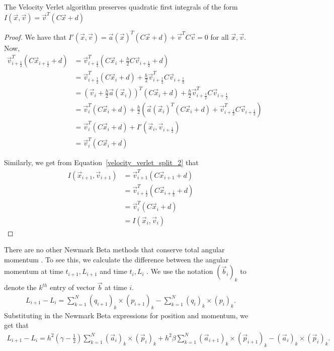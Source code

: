 \documentclass[../Main.tex]{subfiles}
\begin{document}
\begin{theorem} The Velocity Verlet algorithm preserves quadratic first integrals of the form $I(\vec{x}, \vec{v}) = \vec{v}^{T}\left(C\vec{x} + d\right)$ \end{theorem}
\begin{proof}
We have that $I'(\vec{x}, \vec{v}) = \vec{a}(\vec{x})^{T}\left(C\vec{x} + d\right) + \vec{v}^{T}C\vec{v} = 0$ for all $\vec{x}, \vec{v}$.
Now,
\begin{align*}
\vec{v}_{i+\frac{1}{2}}^{T}\left(C\vec{x}_{i+\frac{1}{2}} + d\right) &= \vec{v}_{i+\frac{1}{2}}^{T}\left(C\vec{x}_{i} + \frac{h}{2}C\vec{v}_{i+\frac{1}{2}} + d\right) \\
&= \vec{v}_{i+\frac{1}{2}}^{T}\left(C\vec{x}_{i} + d\right) + \frac{h}{2}\vec{v}_{i+\frac{1}{2}}^{T}C\vec{v}_{i+\frac{1}{2}} \\
&= \left(\vec{v}_{i} + \frac{h}{2}\vec{a}(\vec{x}_{i})\right)^{T}\left(C\vec{x}_{i} + d\right)+ \frac{h}{2}\vec{v}_{i+\frac{1}{2}}^{T}C\vec{v}_{i+\frac{1}{2}} \\
&=\vec{v}_{i}^{T}(C\vec{x}_{i} + d) + \frac{h}{2}\left( \vec{a}(\vec{x}_{i})^{T}(C\vec{x}_{i} + d) + \vec{v}_{i+\frac{1}{2}}^{T}C\vec{v}_{i+\frac{1}{2}}\right) \\
&=\vec{v}_{i}^{T}(C\vec{x}_{i} + d) + I'(\vec{x}_{i}, \vec{v}_{i+\frac{1}{2}}) \\
&=\vec{v}_{i}^{T}(C\vec{x}_{i} + d)
\end{align*}

Similarly, we get from Equation~\ref{velocity_verlet_split_2} that
\begin{align*}
I(\vec{x}_{i+1}, \vec{v}_{i+1}) &=\vec{v}_{i+1}^{T}(C\vec{x}_{i+1} + d) \\
&= \vec{v}_{i+\frac{1}{2}}^{T}\left(C\vec{x}_{i+\frac{1}{2}} + d\right) \\
&=\vec{v}_{i}^{T}(C\vec{x}_{i} + d) \\
&= I(\vec{x}_{i}, \vec{v}_{i})
\end{align*}
\end{proof}

There are no other Newmark Beta methods that conserve total angular momentum \cite{Newmark1959}. To see this, we calculate
the difference between the angular momentum at time $t_{i+1}, L_{i+1}$ and time $t_{i}, L_{i}$ \cite{SimoTarnowWong1992}. We use the notation $\left(\vec{b}_{i}\right)_{k}$ to denote the $k^{th}$ entry of vector $\vec{b}$ at time $i$.
\begin{align*}
L_{i+1} -  L_{i} = \sum_{k=1}^{N}\left(q_{i+1}\right)_{k} \times \left(p_{i+1}\right)_{k} - \sum_{k=1}^{N}\left(q_{i}\right)_{k} \times \left(p_{i}\right)_{k}.
\end{align*}
Substituting in the Newmark Beta expressions for position and momentum, we get that
\begin{align}
L_{i+1} -  L_{i} = h^{2}\left(\gamma - \frac{1}{2}\right)\sum_{k=1}^{N} (\vec{a}_{i})_{k} \times (\vec{p}_{i})_{k} + h^{2}\beta\sum_{k=1}^{N} (\vec{a}_{i+1})_{k} \times (\vec{p}_{i+1})_{k} - (\vec{a}_{i})_{k} \times (\vec{p}_{i})_{k} . \label{eqn:angular_momentum_diff_identity}
\end{align}
\end{document}
